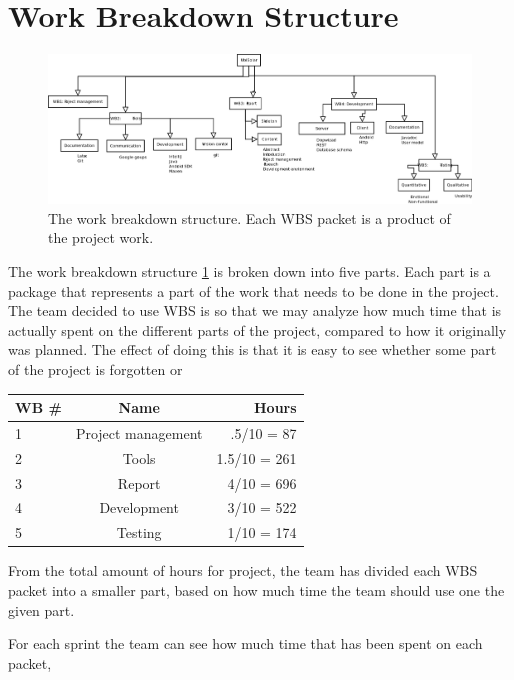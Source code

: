 \section{Work Breakdown Structure}

\begin{figure}[H]
\includegraphics[width=\textwidth]{ch/projectPlan/fig/WBS.png}
\caption{The work breakdown structure. Each WBS packet is a product of the project work.}
\label{fig:wbs}
\end{figure}


The work breakdown structure \ref{fig:wbs} is broken down into five parts. Each part is a package that represents a part of the work that needs to be done in the project.
The team decided to use WBS is so that we may analyze how much time that is actually spent on the different parts of the project, compared to how it originally was planned.
The effect of doing this is that it is easy to see whether some part of the project is forgotten or 

\begin{table}[H]
\centering
{}
\begin{tabular}{l c r}
    \textbf{WB \#} & \textbf{Name} & \textbf{Hours} \\\hline
    1 & Project management & .5/10 = 87\\\hline
    2 & Tools 			   & 1.5/10 = 261\\\hline
    3 & Report 			   & 4/10 = 696\\\hline
    4 & Development 	   & 3/10 = 522\\\hline
    5 & Testing  		   & 1/10 = 174\\\hline
\end{tabular}
\end{table}

From the total amount of hours for project, the team has divided each WBS packet into a smaller part, based on how much time the team should use one the given part.

For each sprint the team can see how much time that has been spent on each packet, 
